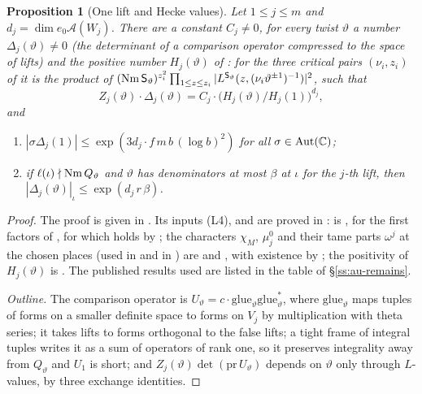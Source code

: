\documentclass[10pt]{amsart}
\newtheorem{proposition}[theorem]{Proposition}
\theoremstyle{definition}
\theoremstyle{remark}
\newcommand{\C}{\mathbb C}
\begin{document}
\begin{proposition}[One lift and Hecke values]\label{au:onelift}
Let $1\le j\le m$ and $d_j=\dim e_0\mathcal A(W_j)$. There are a constant $C_j\ne0$, for every twist
$\vartheta$ a number $\Delta_j(\vartheta)\ne0$ (the determinant of a \emph{comparison operator}
compressed to the space of lifts) and the positive number $H_j(\vartheta)$ of {\cite[(11)]{P54}}: for the three critical pairs $(\nu_i,z_i)$ of {\cite[\S2.7]{P54}} it is the product of $(\operatorname{Nm}\mathsf S_\vartheta)^{z_i^2}\prod_{1\le z\le z_i}|L^{\mathsf S_\vartheta}(z,(\nu_i\vartheta^{\pm1})^{-1})|^2$, such that
\[
Z_j(\vartheta)\cdot\Delta_j(\vartheta)=C_j\cdot\bigl(H_j(\vartheta)/H_j(1)\bigr)^{d_j},
\]
and
\begin{enumerate}
\item[(a)] $|\sigma\Delta_j(1)|\le\exp(3d_j\cdot f\,m\,b\,(\log b)^2)$ for all
$\sigma\in\auAut(\C)$;
\item[(b)] if $\ell(\iota)\nmid\operatorname{Nm} Q_\vartheta$ and $\vartheta$ has denominators at most $\beta$
at $\iota$ for the $j$-th lift, then $|\Delta_j(\vartheta)|_\iota\le\exp(d_j\,r\,\beta)$.
\end{enumerate}
\end{proposition}
\begin{proof}
The proof is given in {\cite[\S2]{P54}}. Its inputs (L4), {\cite[Lemmas~2.13 and~2.14]{P54}} and {\cite[Propositions~2.15, 2.16 and~2.17]{P54}} are proved in {\cite[\S\S4.1, 3.2--3.3, 6, 5.1--5.5 and~4.2]{P54}}: {\cite[Lemma~2.13]{P54}} is {\cite[Theorem~6.10]{P54}}, for the first factors of {\cite[Definition~6.8]{P54}}, for which {\cite[Proposition~2.15]{P54}} holds by {\cite[Proposition~6.9]{P54}}; the characters $\chi_M$, $\mu_j^0$ and their tame parts $\omega^j$ at the chosen places (used in {\cite[\S2.7]{P54}} and in {\cite[Lemma~4.15]{P54}}) are {\cite[Definition~6.14]{P54}} and {\cite[Proposition~6.15]{P54}}, with existence by {\cite[Lemma~8.6]{P49}}; the positivity of $H_j(\vartheta)$ is {\cite[Lemma~2.21]{P54}}. The published results used are listed in the table of \S\ref{ss:au-remains}.

\emph{Outline.} The comparison operator is $U_\vartheta=c\cdot\mathrm{glue}_\vartheta
\mathrm{glue}_\vartheta^*$, where $\mathrm{glue}_\vartheta$ maps tuples of forms on a smaller
definite space to forms on $V_j$ by multiplication with theta series; it takes lifts to forms
orthogonal to the false lifts; a tight frame of integral tuples writes it as a sum of operators of
rank one, so it preserves integrality away from $Q_\vartheta$ and $U_1$ is short; and
$Z_j(\vartheta)\det(\mathrm{pr}\,U_\vartheta)$ depends on $\vartheta$ only through $L$-values, by
three exchange identities.
\end{proof}
\end{document}
